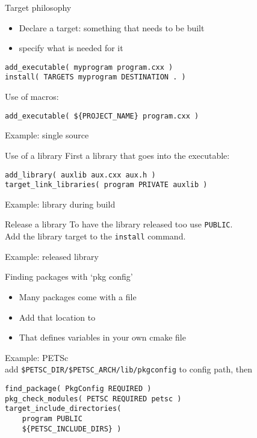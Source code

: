 \begin{numberedframe}{Target philosophy}
  \begin{itemize}
  \item Declare a target: something that needs to be built
  \item specify what is needed for it
  \end{itemize}
\begin{lstlisting}
add_executable( myprogram program.cxx )
install( TARGETS myprogram DESTINATION . )
\end{lstlisting}
Use of macros:
\begin{lstlisting}
add_executable( ${PROJECT_NAME} program.cxx )
\end{lstlisting}
\end{numberedframe}

\begin{numberedframe}{Example: single source}
  
\end{numberedframe}

\begin{numberedframe}{Use of a library}
First a library that goes into the executable:
\begin{lstlisting}
add_library( auxlib aux.cxx aux.h )
target_link_libraries( program PRIVATE auxlib )
\end{lstlisting}
\end{numberedframe}

\begin{numberedframe}{Example: library during build}
    
\end{numberedframe}

\begin{numberedframe}{Release a library}
  To have the library released too use \lstinline{PUBLIC}.\\
  Add the library target to the \lstinline{install} command.
\end{numberedframe}

\begin{numberedframe}{Example: released library}
    
\end{numberedframe}

\begin{numberedframe}{Finding packages with `pkg config'}
  \begin{itemize}
  \item Many packages come with a  file
  \item Add that location to 
  \item That defines variables in your own cmake file
  \end{itemize}
Example: PETSc\\
add \verb+$PETSC_DIR/$PETSC_ARCH/lib/pkgconfig+ to config path,
then
\begin{lstlisting}
find_package( PkgConfig REQUIRED )
pkg_check_modules( PETSC REQUIRED petsc )
target_include_directories(
	program PUBLIC
	${PETSC_INCLUDE_DIRS} )
\end{lstlisting}
\end{numberedframe}

